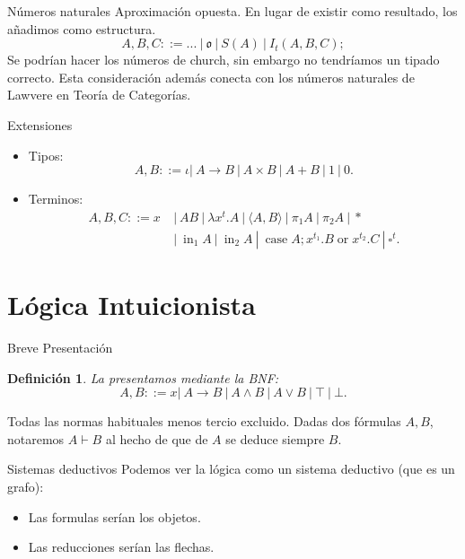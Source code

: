 \documentclass[usenames,dvipsnames]{beamer}
\newcommand{\oo}{\operatorname{ or }}
\newcommand{\ccase}{\operatorname{case}}
\newcommand{\iin}{\operatorname{in}}
\newtheorem{definicion}{Definición}
\begin{document}
\begin{frame}{Números naturales}
  Aproximación opuesta. En lugar de existir como resultado, los añadimos como estructura.
      $$A,B, C ::= ...\ |\ \mathfrak{o}\ |\ S(A)\ |\ I_t(A,B,C);$$
Se podrían hacer los números de church, sin embargo no tendríamos un tipado correcto. Esta consideración además conecta con los números naturales de Lawvere en Teoría de Categorías.

\end{frame}




\begin{frame}{Extensiones}
  \begin{itemize}
  \item Tipos:
    $$A,B ::= \iota |\ A\to B\ |\ A \times B \ |\ A + B  \ |\ 1\ |\ 0.$$
  \item Terminos:
    \begin{align*}
      A,B, C ::= x\ &|\ AB\ |\ \lambda x^t.A \ |\ \langle A,B \rangle\ |\ \pi_1A\ |\ \pi_2A\ |\ * \\
                    &|\ \iin_1 A\ |\ \iin_2 A \ |\ \ccase A ; x^{t_1}.B\oo x^{t_2}.C \ |\ \square^t.
    \end{align*}
  \end{itemize}
\end{frame}
\section{Lógica Intuicionista}

\begin{frame}{Breve Presentación}
  \begin{definicion}
    La presentamos mediante la BNF:
  $$A,B ::= x |\ A\to B\ |\ A \land B \ |\ A \lor B \ |\ \top \ |\ \bot .$$
\end{definicion}
Todas las normas habituales menos tercio excluido. Dadas dos fórmulas $A,B$, notaremos $A\vdash B$ al hecho de que de $A$ se deduce siempre $B$.
\end{frame}

\begin{frame}{Sistemas deductivos}
  Podemos ver la lógica como un sistema deductivo (que es un grafo):
  \begin{itemize}
  \item Las formulas serían los objetos.
  \item Las reducciones serían las flechas.
  \end{itemize}
\end{frame}
\end{document}
